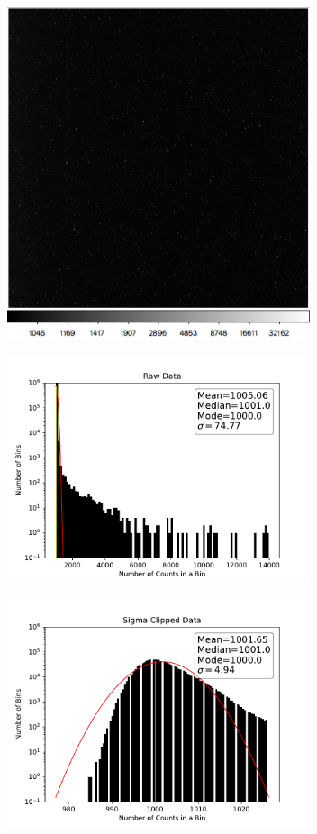 \documentclass[preprint]{aastex62}
\begin{document}
        \begin{figure}
          \centering
            \includegraphics[width=3.5in]{../images/neg10dark_adjusted.png}
            \caption{}
          \label{fig:m10DARKfits}
        \end{figure}
        \begin{figure}
          \centering
            \includegraphics[width=3.5in]{../images/neg10DARK_noOutliers.pdf}
            \caption{}
          \label{fig:neg10DARKhisto}
        \end{figure}
        \begin{figure}
          \centering
            \includegraphics[width=3.5in]{../images/neg10DARK_cut.pdf}
            \caption{}
          \label{fig:neg10DARK_cut}
        \end{figure}
\end{document}
